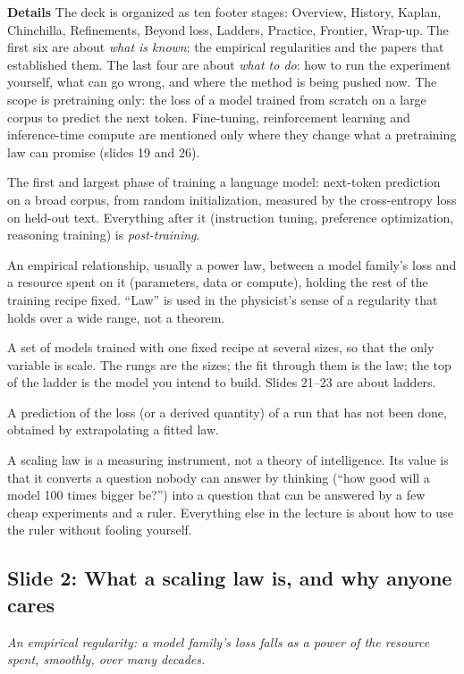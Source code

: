 \documentclass[11pt,letterpaper]{article}
\newcommand{\slide}[3]{%
  \subsection[Slide #1: #2]{Slide #1: #2}%
  {\color{muted}\itshape #3\par}\medskip}
\newcommand{\para}[1]{\medskip\noindent\textbf{#1}\quad}
\newenvironment{terms}{\begin{tcolorbox}[termsbox]\begin{description}[leftmargin=1.1em,itemsep=3pt,topsep=2pt,font=\normalfont]}{\end{description}\end{tcolorbox}}
\newcommand{\term}[2]{\item[\textbf{#1}]\index{#1} #2}
\newenvironment{intuition}{\begin{tcolorbox}[intuitionbox]}{\end{tcolorbox}}
\begin{document}
\para{Details} The deck is organized as ten footer stages: Overview, History, Kaplan, Chinchilla, Refinements, Beyond loss, Ladders, Practice, Frontier, Wrap-up. The first six are about \emph{what is known}: the empirical regularities and the papers that established them. The last four are about \emph{what to do}: how to run the experiment yourself, what can go wrong, and where the method is being pushed now. The scope is pretraining only: the loss of a model trained from scratch on a large corpus to predict the next token. Fine-tuning, reinforcement learning and inference-time compute are mentioned only where they change what a pretraining law can promise (slides 19 and 26).

\begin{terms}
\term{pretraining}{The first and largest phase of training a language model: next-token prediction on a broad corpus, from random initialization, measured by the cross-entropy loss on held-out text. Everything after it (instruction tuning, preference optimization, reasoning training) is \emph{post-training}.}
\term{scaling law}{An empirical relationship, usually a power law, between a model family's loss and a resource spent on it (parameters, data or compute), holding the rest of the training recipe fixed. ``Law'' is used in the physicist's sense of a regularity that holds over a wide range, not a theorem.}
\term{ladder}{A set of models trained with one fixed recipe at several sizes, so that the only variable is scale. The rungs are the sizes; the fit through them is the law; the top of the ladder is the model you intend to build. Slides 21--23 are about ladders.}
\term{forecast}{A prediction of the loss (or a derived quantity) of a run that has not been done, obtained by extrapolating a fitted law.}
\end{terms}

\begin{intuition}
A scaling law is a measuring instrument, not a theory of intelligence. Its value is that it converts a question nobody can answer by thinking (``how good will a model 100 times bigger be?'') into a question that can be answered by a few cheap experiments and a ruler. Everything else in the lecture is about how to use the ruler without fooling yourself.
\end{intuition}

\slide{2}{What a scaling law is, and why anyone cares}{An empirical regularity: a model family's loss falls as a power of the resource spent, smoothly, over many decades.}
\end{document}
